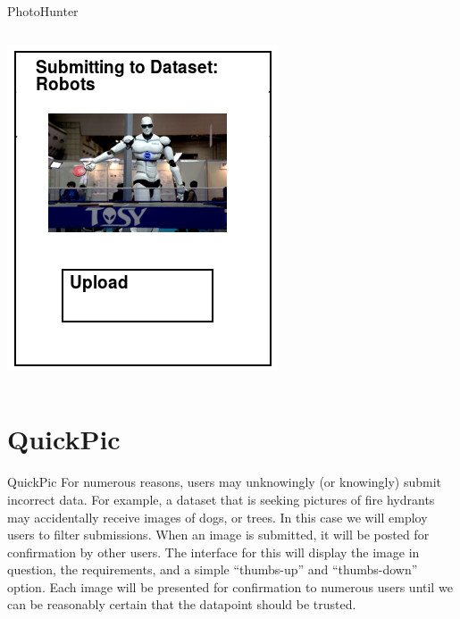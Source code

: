 \documentclass[aspectratio=169]{beamer}
\begin{document}
\begin{frame}{PhotoHunter}
\begin{columns}[c]
\begin{column}{0.5\columnwidth}
      \includegraphics[width=\columnwidth]{ss_photohunter_upload}
    \end{column}
  \end{columns}
\end{frame}

\section{QuickPic}

\begin{frame}{QuickPic}
  For numerous reasons, users may unknowingly (or knowingly) submit
  incorrect data. For example, a dataset that is seeking pictures of
  fire hydrants may accidentally receive images of dogs, or trees. In
  this case we will employ users to filter submissions. When an image
  is
  submitted, it will be posted for confirmation by other users. The
  interface for this will display the image in question, the
  requirements, and a simple ``thumbs-up'' and ``thumbs-down'' option.
  Each image will be presented for confirmation to numerous users
  until
  we can be reasonably certain that the datapoint should be trusted.
\end{frame}
\end{document}
